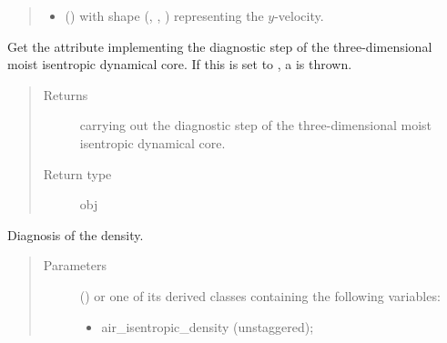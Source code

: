 \documentclass[letterpaper,10pt,english]{sphinxmanual}
\begin{document}
\begin{fulllineitems}
\begin{fulllineitems}
\begin{quote}
\begin{description}
\begin{itemize}
\item {} 
 () \textendash{}  with shape (, , ) representing the \(y\)-velocity.

\end{itemize}

\end{description}\end{quote}

\end{fulllineitems}


\begin{fulllineitems}
\label{\detokenize{api:tasmania.dycore.diagnostic_isentropic.DiagnosticIsentropic.diagnostic}}
Get the attribute implementing the diagnostic step of the three-dimensional moist isentropic dynamical core.
If this is set to , a  is thrown.
\begin{quote}\begin{description}
\item[{Returns}] \leavevmode
{\hyperref[\detokenize{api:tasmania.dycore.diagnostic_isentropic.DiagnosticIsentropic}]{}} carrying out the diagnostic step of the
three-dimensional moist isentropic dynamical core.

\item[{Return type}] \leavevmode
obj

\end{description}\end{quote}

\end{fulllineitems}


\begin{fulllineitems}
\label{\detokenize{api:tasmania.dycore.diagnostic_isentropic.DiagnosticIsentropic.get_air_density}}
Diagnosis of the density.
\begin{quote}\begin{description}
\item[{Parameters}] \leavevmode
{} () \textendash{} 
{\hyperref[\detokenize{api:tasmania.storages.grid_data.GridData}]{}} or one of its derived classes containing the following variables:
\begin{itemize}
\item {} 
air\_isentropic\_density (unstaggered);


\end{itemize}
\end{description}
\end{quote}
\end{fulllineitems}
\end{fulllineitems}
\end{document}
